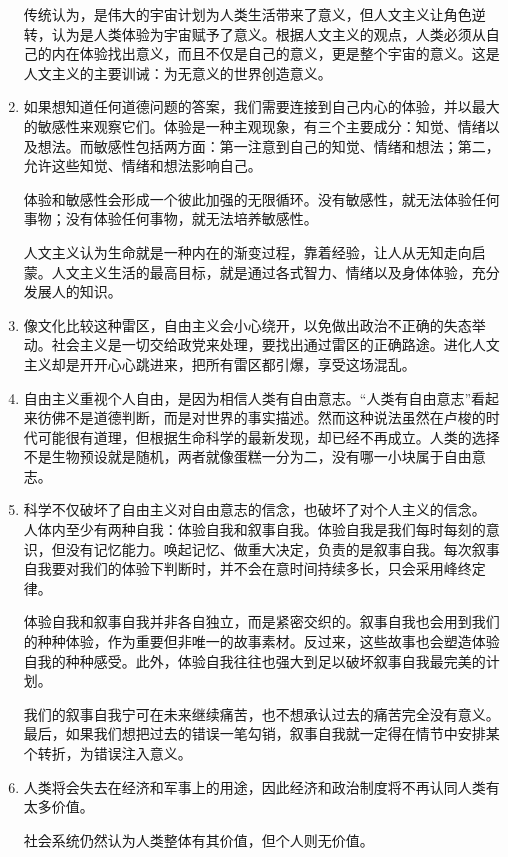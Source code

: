 \documentclass[UTF8]{ctexart}
\begin{document}
\begin{enumerate}
			传统认为，是伟大的宇宙计划为人类生活带来了意义，但人文主义让角色逆转，认为是人类体验为宇宙赋予了意义。根据人文主义的观点，人类必须从自己的内在体验找出意义，而且不仅是自己的意义，更是整个宇宙的意义。这是人文主义的主要训诫：为无意义的世界创造意义。
			
			\item  如果想知道任何道德问题的答案，我们需要连接到自己内心的体验，并以最大的敏感性来观察它们。体验是一种主观现象，有三个主要成分：知觉、情绪以及想法。而敏感性包括两方面：第一注意到自己的知觉、情绪和想法；第二，允许这些知觉、情绪和想法影响自己。
			
			体验和敏感性会形成一个彼此加强的无限循环。没有敏感性，就无法体验任何事物；没有体验任何事物，就无法培养敏感性。
			
			人文主义认为生命就是一种内在的渐变过程，靠着经验，让人从无知走向启蒙。人文主义生活的最高目标，就是通过各式智力、情绪以及身体体验，充分发展人的知识。
			
			
			\item 像文化比较这种雷区，自由主义会小心绕开，以免做出政治不正确的失态举动。社会主义是一切交给政党来处理，要找出通过雷区的正确路途。进化人文主义却是开开心心跳进来，把所有雷区都引爆，享受这场混乱。
			
			\item 自由主义重视个人自由，是因为相信人类有自由意志。“人类有自由意志”看起来彷佛不是道德判断，而是对世界的事实描述。然而这种说法虽然在卢梭的时代可能很有道理，但根据生命科学的最新发现，却已经不再成立。人类的选择不是生物预设就是随机，两者就像蛋糕一分为二，没有哪一小块属于自由意志。
			
			\item 科学不仅破坏了自由主义对自由意志的信念，也破坏了对个人主义的信念。 人体内至少有两种自我：体验自我和叙事自我。体验自我是我们每时每刻的意识，但没有记忆能力。唤起记忆、做重大决定，负责的是叙事自我。每次叙事自我要对我们的体验下判断时，并不会在意时间持续多长，只会采用峰终定律。
			
			体验自我和叙事自我并非各自独立，而是紧密交织的。叙事自我也会用到我们的种种体验，作为重要但非唯一的故事素材。反过来，这些故事也会塑造体验自我的种种感受。此外，体验自我往往也强大到足以破坏叙事自我最完美的计划。
			
			我们的叙事自我宁可在未来继续痛苦，也不想承认过去的痛苦完全没有意义。最后，如果我们想把过去的错误一笔勾销，叙事自我就一定得在情节中安排某个转折，为错误注入意义。
			\item 人类将会失去在经济和军事上的用途，因此经济和政治制度将不再认同人类有太多价值。
			
			社会系统仍然认为人类整体有其价值，但个人则无价值。
			

\end{enumerate}
\end{document}
